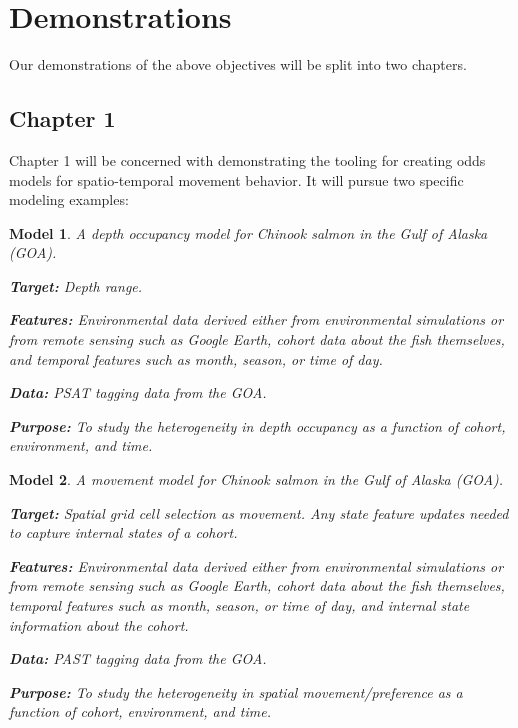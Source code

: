 \documentclass[11pt]{article}
\newtheorem{model}{Model}
\begin{document}
\section{Demonstrations}

Our demonstrations of the above objectives will be split into two chapters. 

\subsection{Chapter 1}

Chapter 1 will be concerned with demonstrating the tooling for creating odds models for spatio-temporal movement behavior. It will pursue two specific modeling examples:

\begin{model}
A depth occupancy model for Chinook salmon in the Gulf of Alaska (GOA). \newline

\textbf{Target:} Depth range. \newline

\textbf{Features:} Environmental data derived either from environmental simulations or from remote sensing such as Google Earth, cohort data about the fish themselves, and temporal features such as month, season, or time of day. \newline

\textbf{Data:} PSAT tagging data from the GOA. \newline 

\textbf{Purpose:} To study the heterogeneity in depth occupancy as a function of cohort, environment, and time.  
\end{model}

\begin{model}
A movement model for Chinook salmon in the Gulf of Alaska (GOA). \newline

\textbf{Target:} Spatial grid cell selection as movement. Any state feature updates needed to capture internal states of a cohort. \newline

\textbf{Features:} Environmental data derived either from environmental simulations or from remote sensing such as Google Earth, cohort data about the fish themselves, temporal features such as month, season, or time of day, and internal state information about the cohort. \newline

\textbf{Data:} PAST tagging data from the GOA. \newline

\textbf{Purpose:} To study the heterogeneity in spatial movement/preference as a function of cohort, environment, and time.\newline

\end{model}
\end{document}
